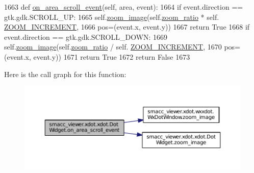 \begin{DoxyCode}
1663     \textcolor{keyword}{def }\hyperlink{classsmacc__viewer_1_1xdot_1_1xdot_1_1DotWidget_ada4f72a63399dca56b8dbbd3db11938e}{on\_area\_scroll\_event}(self, area, event):
1664         \textcolor{keywordflow}{if} event.direction == gtk.gdk.SCROLL\_UP:
1665             self.\hyperlink{classsmacc__viewer_1_1xdot_1_1xdot_1_1DotWidget_a59e85f20fa9e43ffdeb3a3982061ca5d}{zoom\_image}(self.\hyperlink{classsmacc__viewer_1_1xdot_1_1xdot_1_1DotWidget_a61694eba4278e9726bbef68a9ca3f594}{zoom\_ratio} * self.
      \hyperlink{classsmacc__viewer_1_1xdot_1_1xdot_1_1DotWidget_a1c0d2875d33064ba8d476e8142b05a0f}{ZOOM\_INCREMENT},
1666                             pos=(event.x, event.y))
1667             \textcolor{keywordflow}{return} \textcolor{keyword}{True}
1668         \textcolor{keywordflow}{if} event.direction == gtk.gdk.SCROLL\_DOWN:
1669             self.\hyperlink{classsmacc__viewer_1_1xdot_1_1xdot_1_1DotWidget_a59e85f20fa9e43ffdeb3a3982061ca5d}{zoom\_image}(self.\hyperlink{classsmacc__viewer_1_1xdot_1_1xdot_1_1DotWidget_a61694eba4278e9726bbef68a9ca3f594}{zoom\_ratio} / self.
      \hyperlink{classsmacc__viewer_1_1xdot_1_1xdot_1_1DotWidget_a1c0d2875d33064ba8d476e8142b05a0f}{ZOOM\_INCREMENT},
1670                             pos=(event.x, event.y))
1671             \textcolor{keywordflow}{return} \textcolor{keyword}{True}
1672         \textcolor{keywordflow}{return} \textcolor{keyword}{False}
1673 
\end{DoxyCode}


Here is the call graph for this function\+:
\nopagebreak
\begin{figure}[H]
\begin{center}
\leavevmode
\includegraphics[width=350pt]{classsmacc__viewer_1_1xdot_1_1xdot_1_1DotWidget_ada4f72a63399dca56b8dbbd3db11938e_cgraph}
\end{center}
\end{figure}


